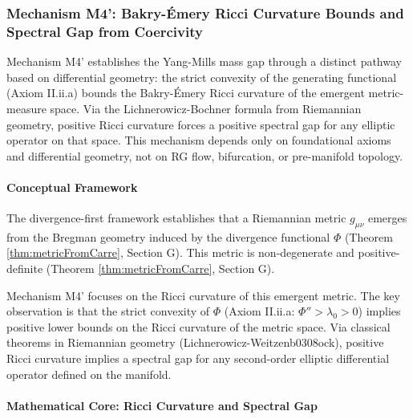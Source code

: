 
\subsubsection{Mechanism M4': Bakry-Émery Ricci Curvature Bounds and Spectral Gap from Coercivity}
\label{subsec:mechanismM4BakryEmery}

Mechanism M4' establishes the Yang-Mills mass gap through a distinct pathway based on differential geometry: the strict convexity of the generating functional (Axiom II.ii.a) bounds the Bakry-Émery Ricci curvature of the emergent metric-measure space. Via the Lichnerowicz-Bochner formula from Riemannian geometry, positive Ricci curvature forces a positive spectral gap for any elliptic operator on that space. This mechanism depends only on foundational axioms and differential geometry, not on RG flow, bifurcation, or pre-manifold topology.

\paragraph{Conceptual Framework}

The divergence-first framework establishes that a Riemannian metric $g_{\mu\nu}$ emerges from the Bregman geometry induced by the divergence functional $\Phi$ (Theorem \ref{thm:metricFromCarre}, Section G). This metric is non-degenerate and positive-definite (Theorem \ref{thm:metricFromCarre}, Section G).

Mechanism M4' focuses on the Ricci curvature of this emergent metric. The key observation is that the strict convexity of $\Phi$ (Axiom II.ii.a: $\Phi'' > \lambda_0 > 0$) implies positive lower bounds on the Ricci curvature of the metric space. Via classical theorems in Riemannian geometry (Lichnerowicz-Weitzenb0308ock), positive Ricci curvature implies a spectral gap for any second-order elliptic differential operator defined on the manifold.

\paragraph{Mathematical Core: Ricci Curvature and Spectral Gap}


